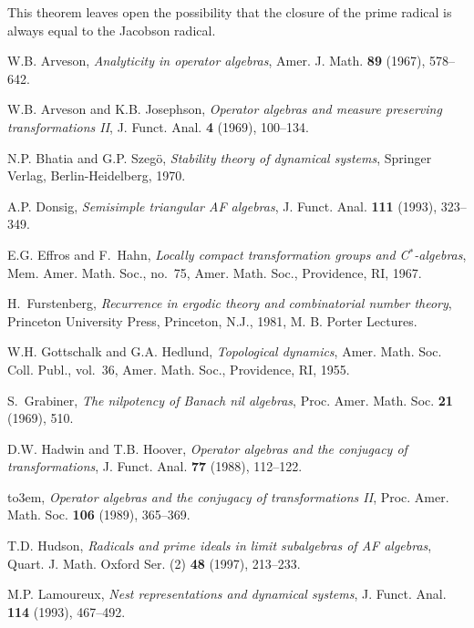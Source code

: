 \documentclass[12pt]{amsart}
\theoremstyle{definition}
\newcommand{\cstar}{C$^*$}
\begin{document}
This theorem leaves open the possibility that the closure of the
prime radical is always equal to the Jacobson radical.

\providecommand{\bysame}{\leavevmode\hbox
to3em{\hrulefill}\thinspace}
\begin{thebibliography}{10}

W.B. Arveson, \emph{Analyticity in operator algebras}, Amer. J. Math.
  \textbf{89} (1967), 578--642.

W.B. Arveson and K.B. Josephson, \emph{Operator algebras and measure preserving
  transformations {II}}, J. Funct. Anal. \textbf{4} (1969), 100--134.

N.P. Bhatia and G.P. Szeg\"{o}, \emph{Stability theory of
dynamical systems}, Springer Verlag, Berlin-Heidelberg, 1970.

A.P. Donsig, \emph{Semisimple triangular {AF} algebras}, J. Funct. Anal.
  \textbf{111} (1993), 323--349.

E.G. Effros and F.~Hahn, \emph{Locally compact transformation groups and
  \cstar-algebras}, Mem. Amer. Math. Soc., no.~75, Amer. Math. Soc.,
  Providence, RI, 1967.

H.~Furstenberg, \emph{Recurrence in ergodic theory and combinatorial number
  theory}, Princeton University Press, Princeton, N.J., 1981, M. B. Porter
  Lectures.

W.H. Gottschalk and G.A. Hedlund, \emph{Topological dynamics}, Amer. Math. Soc.
  Coll. Publ., vol.~36, Amer. Math. Soc., Providence, RI, 1955.

S.~Grabiner, \emph{The nilpotency of {B}anach nil algebras}, Proc. Amer. Math.
  Soc. \textbf{21} (1969), 510.

D.W. Hadwin and T.B. Hoover, \emph{Operator algebras and the conjugacy of
  transformations}, J. Funct. Anal. \textbf{77} (1988), 112--122.

\bysame, \emph{Operator algebras and the conjugacy of transformations {II}},
  Proc. Amer. Math. Soc. \textbf{106} (1989), 365--369.

T.D. Hudson, \emph{Radicals and prime ideals in limit subalgebras of {AF}
  algebras}, Quart. J. Math. Oxford Ser. (2) \textbf{48} (1997), 213--233.

M.P. Lamoureux, \emph{Nest representations and dynamical systems}, J. Funct.
  Anal. \textbf{114} (1993), 467--492.


\end{thebibliography}
\end{document}
